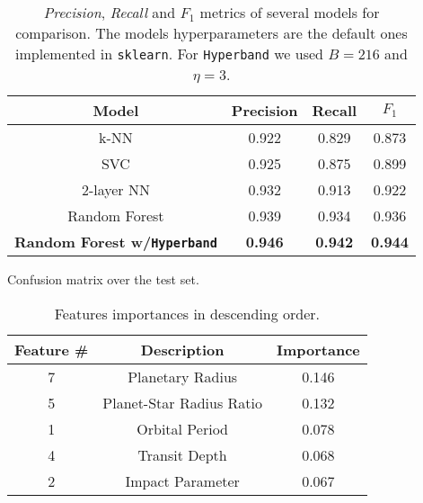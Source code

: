 \documentclass[11pt, a4paper]{article}
\begin{document}
  \begin{table}
    \centering
    \begin{tabular}{|c c c c|}
      \hline
      Model & Precision & Recall & $F_{1}$  \\
      \hline\hline
      k-NN & 0.922 & 0.829 & 0.873 \\
      \hline
      SVC & 0.925 & 0.875 & 0.899 \\
      \hline
      2-layer NN & 0.932 & 0.913 & 0.922 \\
      \hline
      Random Forest & 0.939 & 0.934 & 0.936 \\
      \hline
      \textbf{Random Forest w/\texttt{Hyperband}} & \textbf{0.946} & \textbf{0.942} & \textbf{0.944} \\
      \hline
    \end{tabular}
    \caption{\textit{Precision}, \textit{Recall} and $F_{1}$ metrics of several models for comparison. The models hyperparameters are the default ones implemented in \texttt{sklearn}. For \texttt{Hyperband} we used $B=216$ and $\eta=3$.}
    \label{table:benchmark}
  \end{table}
  
  \begin{table}
    \centering
    \caption{Confusion matrix over the test set.}
    \label{table:confusion}
  \end{table}

  \begin{table}
    \centering
    \begin{tabular}{|c c c|}
    \hline
    Feature \# & Description & Importance \\
    \hline\hline
    7 & Planetary Radius & 0.146 \\
    5 & Planet-Star Radius Ratio & 0.132 \\
    1 & Orbital Period & 0.078 \\
    4 & Transit Depth & 0.068 \\
    2 & Impact Parameter & 0.067 \\
    \hline
    \end{tabular}
    \caption{Features importances in descending order.}
    \label{table:importances}
  \end{table}
\end{document}
